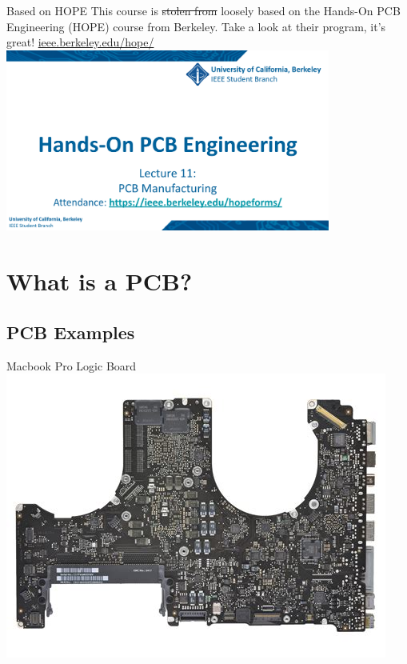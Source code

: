 \documentclass{beamer}
\begin{document}
\begin{frame}{Based on HOPE}
  \centering
  This course is \sout{stolen from} loosely based on the Hands-On PCB Engineering (HOPE) course from Berkeley. Take a look at their program, it's great! \href{https://ieee.berkeley.edu/hope/}{ieee.berkeley.edu/hope/}\\
  \vspace{1cm}
  \includegraphics[width=0.8\textwidth]{images/HOPE-course.png}
\end{frame}

\section{What is a PCB?}
\subsection{PCB Examples}

\begin{frame}{Macbook Pro Logic Board}
  \includegraphics[width=\textwidth]{images/macbook.png}
\end{frame}
\end{document}

